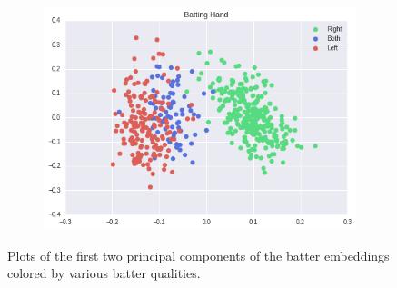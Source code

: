 \documentclass{article}
\begin{document}
\begin{figure}[h]
\begin{minipage}{.5\textwidth}
    \begin{subfigure}{0.5\linewidth}
    \centering
    \includegraphics[width=1\linewidth]{batter_hand.png}
    \caption{}
    \end{subfigure}
\caption{Plots of the first two principal components of the batter embeddings colored by various batter qualities.}
\label{fig:batter_traits}
\end{minipage}
\end{figure}
\end{document}
